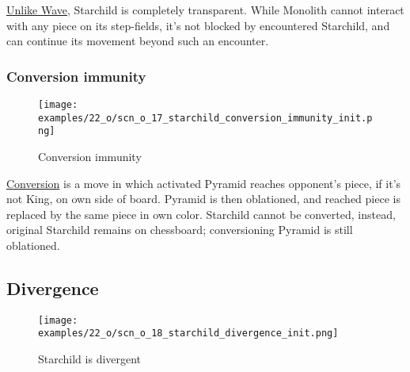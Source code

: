 \vspace*{-0.4\baselineskip}
\hyperref[fig:scn_d_02_monolith_first_step]{Unlike Wave}, Starchild is completely
transparent. While Monolith cannot interact with any piece on its step-fields, it's
not blocked by encountered Starchild, and can continue its movement beyond such an
encounter.

\clearpage %

\subsubsection*{Conversion immunity}
\label{sec:One/Starchild/Movement/Conversion immunity}

\vspace*{-1.4\baselineskip}
\noindent
\begin{figure}[!h]
\texttt{[image: examples/22\_o/scn\_o\_17\_starchild\_conversion\_immunity\_init.png]}
\caption{Conversion immunity}
\label{fig:scn_o_17_starchild_conversion_immunity_init}
\end{figure}

\hyperref[sec:Mayan Ascendancy/Pyramid/Conversion]{Conversion} is a move in which
activated Pyramid reaches opponent's piece, if it's not King, on own side of board.
Pyramid is then oblationed, and reached piece is replaced by the same piece in own
color. Starchild cannot be converted, instead, original Starchild remains on
chessboard; conversioning Pyramid is still oblationed.

\clearpage %

\subsection*{Divergence}
\label{sec:One/Starchild/Divergence}

\vspace*{-1.5\baselineskip}
\noindent
\begin{figure}[!h]
\texttt{[image: examples/22\_o/scn\_o\_18\_starchild\_divergence\_init.png]}
\vspace*{-1.4\baselineskip}
\caption{Starchild is divergent}
\label{fig:scn_o_18_starchild_divergence_init}
\end{figure}

